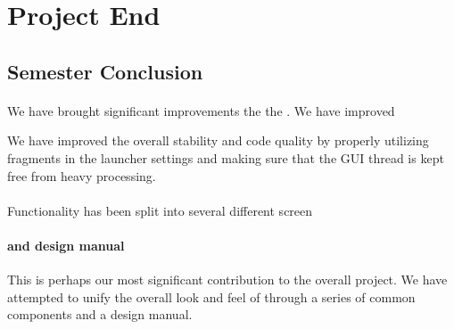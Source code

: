 \part{Project End}
\chapter{Semester Conclusion}
\label{cha:conclusion_final}

\subsection{\launcher}
We have brought significant improvements the the \launcher. We have improved 


We have improved the overall stability and code quality by properly utilizing fragments in the launcher settings and making sure that the GUI thread is kept free from heavy processing.   

\subsection{\ct}

Functionality has been split into several different screen

\subsection{\gc and design manual}

This is perhaps our most significant contribution to the overall project. We have attempted to unify the overall look and feel of \giraf through a series of common components and a design manual. 



